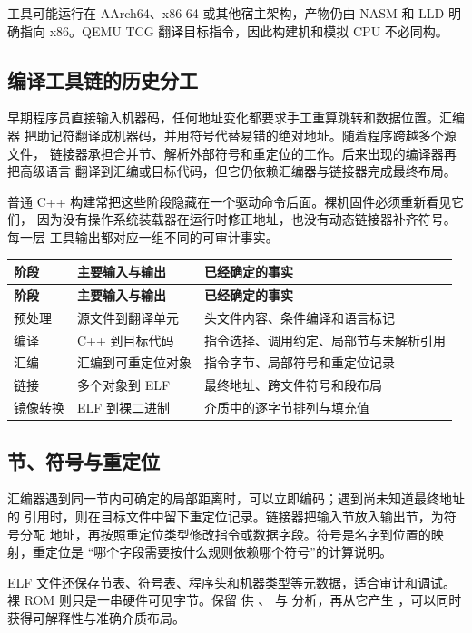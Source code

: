 工具可能运行在 AArch64、x86-64 或其他宿主架构，产物仍由 NASM 和 LLD
明确指向 x86。QEMU TCG 翻译目标指令，因此构建机和模拟 CPU 不必同构。

\subsection{编译工具链的历史分工}

早期程序员直接输入机器码，任何地址变化都要求手工重算跳转和数据位置。汇编器
把助记符翻译成机器码，并用符号代替易错的绝对地址。随着程序跨越多个源文件，
链接器承担合并节、解析外部符号和重定位的工作。后来出现的编译器再把高级语言
翻译到汇编或目标代码，但它仍依赖汇编器与链接器完成最终布局。

普通 C++ 构建常把这些阶段隐藏在一个驱动命令后面。裸机固件必须重新看见它们，
因为没有操作系统装载器在运行时修正地址，也没有动态链接器补齐符号。每一层
工具输出都对应一组不同的可审计事实。

\begin{longtable}{L{0.16\textwidth}L{0.24\textwidth}L{0.42\textwidth}}
\toprule
\textbf{阶段} & \textbf{主要输入与输出} & \textbf{已经确定的事实}\\
\midrule
\endfirsthead
\toprule
\textbf{阶段} & \textbf{主要输入与输出} & \textbf{已经确定的事实}\\
\midrule
\endhead
预处理 & 源文件到翻译单元 & 头文件内容、条件编译和语言标记\\
编译 & C++ 到目标代码 & 指令选择、调用约定、局部节与未解析引用\\
汇编 & 汇编到可重定位对象 & 指令字节、局部符号和重定位记录\\
链接 & 多个对象到 ELF & 最终地址、跨文件符号和段布局\\
镜像转换 & ELF 到裸二进制 & 介质中的逐字节排列与填充值\\
\bottomrule
\end{longtable}

\subsection{节、符号与重定位}

汇编器遇到同一节内可确定的局部距离时，可以立即编码；遇到尚未知道最终地址的
引用时，则在目标文件中留下重定位记录。链接器把输入节放入输出节，为符号分配
地址，再按照重定位类型修改指令或数据字段。符号是名字到位置的映射，重定位是
“哪个字段需要按什么规则依赖哪个符号”的计算说明。

ELF 文件还保存节表、符号表、程序头和机器类型等元数据，适合审计和调试。
裸 ROM 则只是一串硬件可见字节。保留  供
、 与  分析，再从它产生
，可以同时获得可解释性与准确介质布局。

